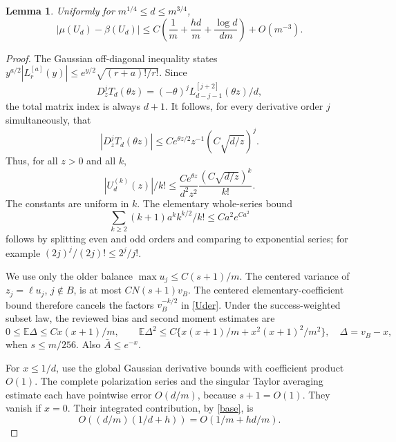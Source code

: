 \documentclass[11pt]{article}
\newtheorem{lemma}{Lemma}
\newcommand{\E}{\mathbb E}
\begin{document}
\begin{lemma}\label{comparison}
Uniformly for $m^{1/4}\le d\le m^{3/4}$,
\[
 |\mu(U_d)-\beta(U_d)|
 \le C\left(\frac1m+\frac{hd}m+\frac{\log d}{dm}\right)+O(m^{-3}).
\]
\end{lemma}
\begin{proof}
The Gaussian off-diagonal inequality states
$y^{a/2}|L_r^{[a]}(y)|\le e^{y/2}\sqrt{(r+a)!/r!}$.
Since
\[
 D_z^j T_d(\theta z)=(-\theta)^jL_{d-j-1}^{[j+2]}(\theta z)/d,
\]
the total matrix index is always $d+1$. It follows, for every
derivative order $j$ simultaneously, that
\[
 |D_z^jT_d(\theta z)|\le C e^{\theta z/2}z^{-1}
                                  (C\sqrt{d/z})^j.
\]
Thus, for all $z>0$ and all $k$,
\begin{equation}\label{Uder}
 |U_d^{(k)}(z)|/k!
       \le\frac{C e^{\theta z}}{d^2z^2}
                                \frac{(C\sqrt{d/z})^k}{k!}.
\end{equation}
The constants are uniform in $k$. The elementary whole-series bound
\begin{equation}\label{series}
 \sum_{k\ge2}(k+1)a^k k^{k/2}/k!\le Ca^2e^{Ca^2}
\end{equation}
follows by splitting even and odd orders and comparing to exponential
series; for example $(2j)^j/(2j)!\le2^j/j!$.

We use only the older balance $\max u_j\le C(s+1)/m$.
The centered variance of $z_j=\ell u_j$, $j\notin B$, is at most
$CN(s+1)v_B$. The centered elementary-coefficient bound therefore
cancels the factors $v_B^{-k/2}$ in \eqref{Uder}.
Under the success-weighted subset law, the reviewed bias and second
moment estimates are
\begin{equation}\label{moments}
 0\le\E\Delta\le Cx(x+1)/m,\qquad
 \E\Delta^2\le C\{x(x+1)/m+x^2(x+1)^2/m^2\},
 \quad\Delta=v_B-x,
\end{equation}
when $s\le m/256$. Also $\bar A\le e^{-x}$.

For $x\le1/d$, use the global Gaussian derivative bounds with
coefficient product $O(1)$. The complete polarization series and
the singular Taylor averaging estimate each have pointwise error
$O(d/m)$, because $s+1=O(1)$. They vanish if $x=0$.
Their integrated contribution, by \eqref{base}, is
\begin{equation}\label{small}
 O((d/m)(1/d+h))=O(1/m+hd/m).
\end{equation}


\end{proof}
\end{document}
